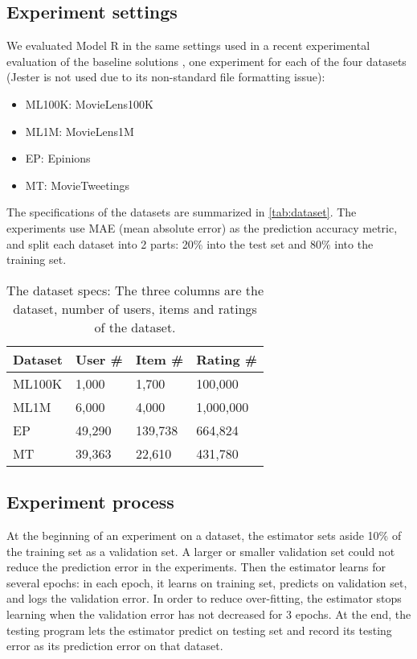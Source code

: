 \documentclass[letterpaper]{article}
\begin{document}
\subsection{Experiment settings}
We evaluated Model R in the same settings used in a recent experimental 
evaluation of the baseline solutions \citeauthor{polatidis2016multi},
one experiment for each of the four datasets 
(Jester \citeauthor{goldberg2001eigentaste} is not used due to its non-standard 
file 
formatting issue): 
\begin{itemize}
	\item ML100K: MovieLens100K\citeauthor{harper2015movielens}
	\item ML1M: MovieLens1M\citeauthor{harper2015movielens}
	\item EP: Epinions \citeauthor{massa2007trust}
	\item MT: MovieTweetings \citeauthor{dooms2013movietweetings}
\end{itemize}
The specifications of the datasets are summarized in \autoref{tab:dataset}.
The experiments use MAE (mean absolute error) as the prediction accuracy 
metric, and split each dataset into 2 parts: 20\% into the test set and 80\% 
into the training set.
\begin{table}[!htb]
	\centering
	\caption{The dataset specs: 
		The three columns are the dataset, number of users, items and ratings 
		of the dataset.
		}
	\begin{tabularx}{0.47\textwidth}{|X|X|X|X|}  \hline \rowcolor{blue!50}
		Dataset & User \# & Item \# & Rating \# \\ \hline
		ML100K  & 1,000   & 1,700   & 100,000 \\ \hline
		ML1M    & 6,000   & 4,000   & 1,000,000 \\ \hline
		EP      & 49,290  & 139,738 & 664,824 \\ \hline
		MT      & 39,363  & 22,610  & 431,780 \\ 
		\hline
	\end{tabularx}
	\label{tab:dataset}
\end{table}

\subsection{Experiment process}
At the beginning of an experiment on a dataset,
the estimator sets aside 10\% of the training set as a validation set.
A larger or smaller validation set could not reduce the prediction error in the 
experiments.
Then the estimator learns for several epochs:
in each epoch, it learns on training set, predicts on validation set, and logs 
the validation error.
In order to reduce over-fitting, the estimator stops learning when the 
validation error has not decreased for 3 epochs.
At the end, the testing program lets the estimator predict on testing set and 
record its testing error as its prediction error on that dataset.
\end{document}
